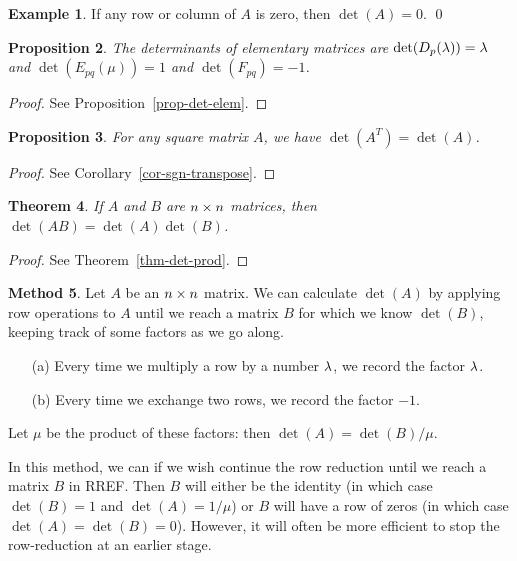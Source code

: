 \documentclass[reqno]{amsart}
\newtheorem{theorem}{Theorem}[section]
\newtheorem{proposition}[theorem]{Proposition}
\theoremstyle{definition}
\newtheorem{example}[theorem]{Example}
\newtheorem{method}[theorem]{Method}
\begin{document}
\begin{example}\label{eg-det-zero}
 If any row or column of $A$ is zero, then $\det(A)=0$. \qed
\end{example}

\begin{proposition}\label{prop-det-elem-pre}
 The determinants of elementary matrices are $\det(D_p(\lambda))=\lambda$ and
 $\det(E_{pq}(\mu))=1$ and $\det(F_{pq})=-1$.
\end{proposition}
\begin{proof}
 See Proposition~\ref{prop-det-elem}.
\end{proof}

\begin{proposition}\label{prop-sgn-transpose-pre}
 For any square matrix $A$, we have $\det(A^T)=\det(A)$.
\end{proposition}
\begin{proof}
 See Corollary~\ref{cor-sgn-transpose}.
\end{proof}

\begin{theorem}\label{thm-det-prod-pre}
 If $A$ and $B$ are $n\times n$ matrices, then $\det(AB)=\det(A)\det(B)$.
\end{theorem}
\begin{proof}
 See Theorem~\ref{thm-det-prod}.
\end{proof}

\begin{method}\label{meth-det-ro}
 Let $A$ be an $n\times n$ matrix.  We can calculate $\det(A)$ by
 applying row operations to $A$ until we reach a matrix $B$ for which
 we know $\det(B)$, keeping track of some factors as we go along.
 \begin{itemize}
  \item[(a)] Every time we multiply a row by a number $\lambda$, we record
   the factor $\lambda$.
  \item[(b)] Every time we exchange two rows, we record the factor
   $-1$.
 \end{itemize}
 Let $\mu$ be the product of these factors: then $\det(A)=\det(B)/\mu$.
\end{method}

In this method, we can if we wish continue the row reduction until we
reach a matrix $B$ in RREF.  Then $B$ will either be the identity (in
which case $\det(B)=1$ and $\det(A)=1/\mu$) or $B$ will have a row of
zeros (in which case $\det(A)=\det(B)=0$).  However, it will often be
more efficient to stop the row-reduction at an earlier stage.
\end{document}
